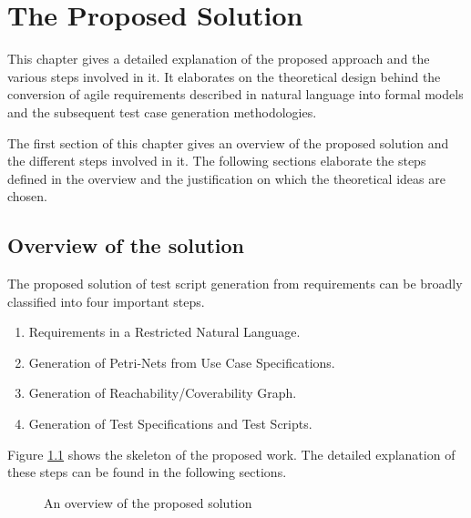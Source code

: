 \chapter{The Proposed Solution}
This chapter gives a detailed explanation of the proposed approach and the various steps involved in it. It elaborates on the theoretical design behind the conversion of agile requirements described in natural language into formal models and the subsequent test case generation methodologies.
 
The first section of this chapter gives an overview of the proposed solution and the different steps involved in it. The following sections elaborate the steps defined in the overview and the justification on which the theoretical ideas are chosen.


\section{Overview of the solution}
The proposed solution of test script generation from requirements can be broadly classified into four important steps.
\begin{enumerate}
\item Requirements in a Restricted Natural Language.
\item Generation of Petri-Nets from Use Case Specifications.
\item Generation of Reachability/Coverability Graph.
\item Generation of Test Specifications and Test Scripts.
\end{enumerate}
Figure \ref{fig:proposed_solution2} shows the skeleton of the proposed work. The detailed explanation of these steps can be found in the following sections.

\begin{figure}[]
\centering
{}
\caption{An overview of the proposed solution}
\label{fig:proposed_solution2}
\end{figure}



